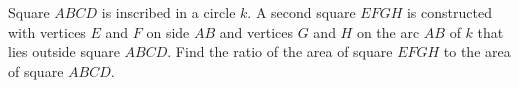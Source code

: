 Square $ABCD$ is inscribed in a circle $k$. A second square $EFGH$ is constructed with vertices $E$ and $F$ on side $AB$ and vertices $G$ and $H$ on the arc $AB$ of $k$ that lies outside square $ABCD$. Find the ratio of the area of square $EFGH$ to the area of square $ABCD$.
